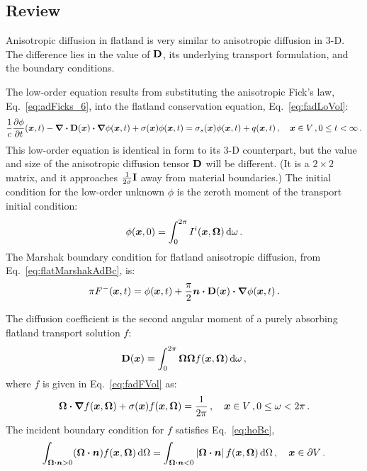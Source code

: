 \subsection{Review}

Anisotropic diffusion in flatland is very similar to anisotropic diffusion in 3-D. The
difference lies in the value of $\mathbf{D}$, its underlying transport formulation,
and the boundary conditions.

The low-order equation results from substituting the anisotropic Fick's law,
Eq.~\eqref{eq:adFicks_6}, into the flatland conservation equation,
Eq.~\eqref{eq:fadLoVol}:
\begin{equation*}
\frac{1}{c} \frac{\partial \phi}{\partial t} (\bm{x}, t)
  - \bm{\nabla} \bm{\cdot} \mathbf{D}(\bm{x}) \bm{\cdot} \bm{\nabla} \phi(\bm{x}, t)
  + \sigma(\bm{x}) \phi(\bm{x}, t)
  = \sigma_s(\bm{x}) \phi(\bm{x},t) + q(\bm{x},t)\,,\quad \bm{x}\in V\,,
  0 \le t < \infty\,.
\end{equation*}
This low-order equation is identical in form to its 3-D counterpart, but the
value and size of the anisotropic diffusion tensor $\mathbf{D}$ will be different.
(It is a $2\times 2$ matrix, and it approaches $\frac{1}{2\sigma}
\mathbf{I}$ away from material boundaries.)
The initial condition for the low-order unknown $\phi$ is the zeroth moment of
the transport initial condition:
\begin{equation*}
  \phi(\bm{x},0) = \int_{0}^{2\pi} I^i(\bm{x},\bm{\Omega}) \mathop{}\!\mathrm{d}\omega\,.
\end{equation*}
The Marshak boundary condition for flatland anisotropic diffusion, from
Eq.~\eqref{eq:flatMarshakAdBc}, is:
\begin{equation*}
\pi F^-(\bm{x},t) 
=
\phi(\bm{x},t)
+ \frac{\pi}{2}\bm{n} \bm{\cdot} \mathbf{D}(\bm{x}) \bm{\cdot} \bm{\nabla} \phi(\bm{x},t) \,.
\end{equation*}

The diffusion coefficient is the second angular moment of a purely absorbing
flatland transport solution $f$:
\begin{equation}\label{eq:flatDDefinition}
  \mathbf{D}(\bm{x}) \equiv \int_{0}^{2\pi} \bm{\Omega} \bm{\Omega}
  f(\bm{x}, \bm{\Omega}) \mathop{}\!\mathrm{d}\omega \,,
\end{equation}
where $f$ is given in Eq.~\eqref{eq:fadFVol} as:
\begin{equation*}
  \bm{\Omega}\bm{\cdot} \bm{\nabla} f(\bm{x}, \bm{\Omega})
  + \sigma(\bm{x}) f (\bm{x}, \bm{\Omega})
= \frac{1}{2\pi} \,, \quad \bm{x}\in V\,, 0 \le \omega < 2\pi \,.
\end{equation*}
The incident boundary condition for $f$ satisfies Eq.~\eqref{eq:hoBc},
\begin{equation*}
  \int_{\bm{\Omega}\bm{\cdot}\bm{n} > 0} (\bm{\Omega}\bm{\cdot} \bm{n})
  f(\bm{x}, \bm{\Omega}) \mathop{}\!\mathrm{d}\Omega
  =
  \int_{\bm{\Omega}\bm{\cdot}\bm{n} < 0} \left| \bm{\Omega}\bm{\cdot} \bm{n} \right|
  f(\bm{x}, \bm{\Omega}) \mathop{}\!\mathrm{d}\Omega\,, \quad \bm{x}\in \partial V \,.
\end{equation*}

